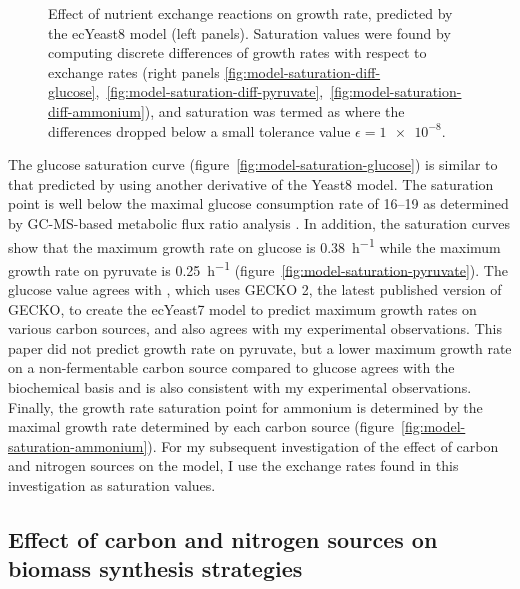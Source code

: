 \begin{figure}
  \caption{
    Effect of nutrient exchange reactions on growth rate, predicted by the ecYeast8 model (left panels).
    Saturation values were found by computing discrete differences of growth rates with respect to exchange rates
    (right panels \ref{fig:model-saturation-diff-glucose},~\ref{fig:model-saturation-diff-pyruvate},~\ref{fig:model-saturation-diff-ammonium}),
    and saturation was termed as where the differences dropped below a small tolerance value $\epsilon = \num{1e-8}$.
  }
  \label{fig:model-saturation}
\end{figure}

The glucose saturation curve (figure~\ref{fig:model-saturation-glucose}) is similar to that predicted by \textcite{elsemmanWholecellModelingYeast2022} using another derivative of the Yeast8 model.
The saturation point is well below the maximal glucose consumption rate of \SIrange{16}{19}{\mmolgdwh} as determined by GC-MS-based metabolic flux ratio analysis \parencite{blankTCACycleActivity2004}.
In addition, the saturation curves show that the maximum growth rate on glucose is \SI{0.38}{\hour^{-1}} while the maximum growth rate on pyruvate is \SI{0.25}{\hour^{-1}} (figure~\ref{fig:model-saturation-pyruvate}).
The glucose value agrees with \textcite{domenzainReconstructionCatalogueGenomescale2022}, which uses GECKO 2, the latest published version of GECKO, to create the ecYeast7 model to predict maximum growth rates on various carbon sources, and also agrees with my experimental observations.
This paper did not predict growth rate on pyruvate, but a lower maximum growth rate on a non-fermentable carbon source compared to glucose agrees with the biochemical basis and is also consistent with my experimental observations.
Finally, the growth rate saturation point for ammonium is determined by the maximal growth rate determined by each carbon source (figure~\ref{fig:model-saturation-ammonium}).
For my subsequent investigation of the effect of carbon and nitrogen sources on the model, I use the exchange rates found in this investigation as saturation values.

\subsection{Effect of carbon and nitrogen sources on biomass synthesis strategies}
\label{subsec:model-grid}

